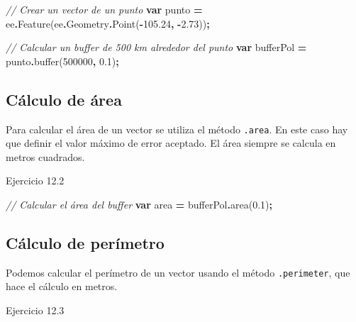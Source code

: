 \documentclass[
  12pt,
  letterpaper,
  twoside]{book}
\newenvironment{Shaded}{\begin{snugshade}}{\end{snugshade}}
\newcommand{\AttributeTok}[1]{\textcolor[rgb]{0.77,0.63,0.00}{#1}}
\newcommand{\CommentTok}[1]{\textcolor[rgb]{0.56,0.35,0.01}{\textit{#1}}}
\newcommand{\DecValTok}[1]{\textcolor[rgb]{0.00,0.00,0.81}{#1}}
\newcommand{\FloatTok}[1]{\textcolor[rgb]{0.00,0.00,0.81}{#1}}
\newcommand{\FunctionTok}[1]{\textcolor[rgb]{0.00,0.00,0.00}{#1}}
\newcommand{\KeywordTok}[1]{\textcolor[rgb]{0.13,0.29,0.53}{\textbf{#1}}}
\newcommand{\NormalTok}[1]{#1}
\newcommand{\OperatorTok}[1]{\textcolor[rgb]{0.81,0.36,0.00}{\textbf{#1}}}
\begin{document}
\begin{Shaded}
\begin{Highlighting}[]
\CommentTok{// Crear un vector de un  punto}
\KeywordTok{var}\NormalTok{ punto }\OperatorTok{=}\NormalTok{ ee}\OperatorTok{.}\FunctionTok{Feature}\NormalTok{(ee}\OperatorTok{.}\AttributeTok{Geometry}\OperatorTok{.}\FunctionTok{Point}\NormalTok{(}\OperatorTok{{-}}\FloatTok{105.24}\OperatorTok{,} \OperatorTok{{-}}\FloatTok{2.73}\NormalTok{))}\OperatorTok{;}

\CommentTok{// Calcular un buffer de 500 km alrededor del punto}
\KeywordTok{var}\NormalTok{ bufferPol }\OperatorTok{=}\NormalTok{ punto}\OperatorTok{.}\FunctionTok{buffer}\NormalTok{(}\DecValTok{500000}\OperatorTok{,} \FloatTok{0.1}\NormalTok{)}\OperatorTok{;}
\end{Highlighting}
\end{Shaded}

\hypertarget{cuxe1lculo-de-uxe1rea}{%
\subsection*{Cálculo de área}\label{cuxe1lculo-de-uxe1rea}}

Para calcular el área de un vector se utiliza el método \texttt{.area}. En este caso hay que definir el valor máximo de error aceptado. El área siempre se calcula en metros cuadrados.

Ejercicio 12.2

\begin{Shaded}
\begin{Highlighting}[]
\CommentTok{// Calcular el área del buffer}
\KeywordTok{var}\NormalTok{ area }\OperatorTok{=}\NormalTok{ bufferPol}\OperatorTok{.}\FunctionTok{area}\NormalTok{(}\FloatTok{0.1}\NormalTok{)}\OperatorTok{;}
\end{Highlighting}
\end{Shaded}

\hypertarget{cuxe1lculo-de-peruxedmetro}{%
\subsection*{Cálculo de perímetro}\label{cuxe1lculo-de-peruxedmetro}}

Podemos calcular el perímetro de un vector usando el método \texttt{.perimeter}, que hace el cálculo en metros.

Ejercicio 12.3
\end{document}
